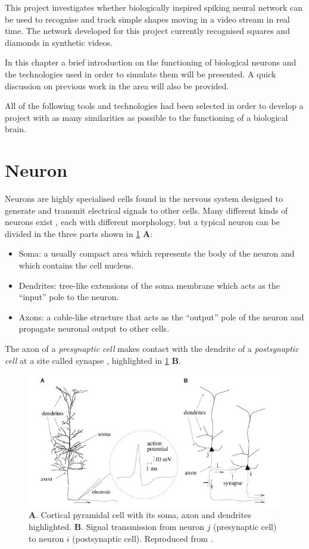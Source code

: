 This project investigates whether biologically inspired spiking neural network can be used to recognise and track simple shapes moving in a video stream in real time. The network developed for this project currently recognised squares and diamonds in synthetic videos. 

In this chapter a brief introduction on the functioning of biological neurons and the technologies used in order to simulate them will be presented. A quick discussion on previous work in the area will also be provided. 

All of the following tools and technologies had been selected in order to develop a project with as many similarities as possible to the functioning of a biological brain. 


\section{Neuron}
Neurons are highly specialised cells found in the nervous system designed to generate and transmit electrical signals to other cells. Many different kinds of neurons exist \cite{Llinas:2008}, each with different morphology, but a typical neuron can be divided in the three parts shown in \cref{fig:neuron_morphology} \textbf{A}:
\begin{itemize}
    \item Soma: a usually compact area which represents the body of the neuron and which contains the cell nucleus.
    \item Dendrites: tree-like extensions of the soma membrane which acts as the ``input'' pole to the neuron.
    \item Axons: a cable-like structure that acts as the ``output'' pole of the neuron and propagate neuronal output to other cells.
\end{itemize}
The axon of a \textit{presynaptic cell} makes contact with the dendrite of a \textit{postsynaptic cell} at a site called synapse \cite{Gerstner:2014}, highlighted in \cref{fig:neuron_morphology} \textbf{B}.

\begin{figure}[ht]
\centering
\includegraphics[scale=0.6]{images/context/neuron.png}
\caption[Neuron Morphology]{\textbf{A}. Cortical pyramidal cell with its soma, axon and dendrites highlighted. \textbf{B}. Signal transmission from neuron $j$ (presynaptic cell) to neuron $i$ (postsynaptic cell). Reproduced from \cite{Gerstner:2014}.}
\label{fig:neuron_morphology}
\end{figure}

